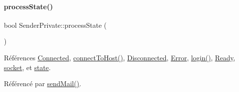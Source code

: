 \paragraph{\texorpdfstring{process\+State()}{processState()}}
{\footnotesize\ttfamily bool Sender\+Private\+::process\+State (\begin{DoxyParamCaption}{ }\end{DoxyParamCaption})}



Références \hyperlink{class_simple_mail_1_1_sender_private_ae09befddf0fae8e8f2ea153ead2b8b0aa81776327acf2e160bb969693bdc4bc3b}{Connected}, \hyperlink{class_simple_mail_1_1_sender_private_aa2f9a37cfe58c3e39afa75e79070cee1}{connect\+To\+Host()}, \hyperlink{class_simple_mail_1_1_sender_private_ae09befddf0fae8e8f2ea153ead2b8b0aa53bd8486efb3caf4d88b5e4962182b5a}{Disconnected}, \hyperlink{class_simple_mail_1_1_sender_private_ae09befddf0fae8e8f2ea153ead2b8b0aa86a2d9c3162cdacedf7c8948d2d99fe4}{Error}, \hyperlink{class_simple_mail_1_1_sender_private_a927e5c262ee89fb335410ebec020091d}{login()}, \hyperlink{class_simple_mail_1_1_sender_private_ae09befddf0fae8e8f2ea153ead2b8b0aac1f1f30c7c54375f9bed9a95bd082416}{Ready}, \hyperlink{class_simple_mail_1_1_sender_private_a223cab47555a39f45f30569328fa20bc}{socket}, et \hyperlink{class_simple_mail_1_1_sender_private_af73e80fdae8024d12714f6f3a1cc1e23}{state}.



Référencé par \hyperlink{class_simple_mail_1_1_sender_private_a2ede5284746e77ee37b8fe96f4bbb100}{send\+Mail()}.


